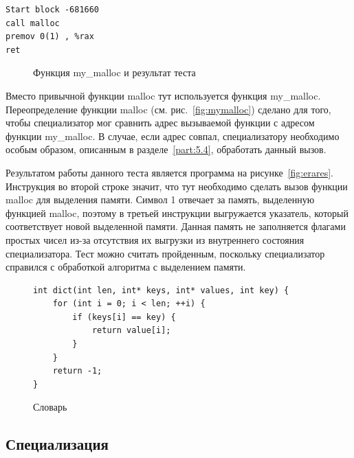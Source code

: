 \newsavebox\boxtw
\begin{lrbox}{\boxtw}
\begin{lstlisting}[xleftmargin = 20pt]
Start block -681660
call malloc
premov 0(1) , %rax 
ret
\end{lstlisting}
\end{lrbox}

\begin{figure}[!t]
\hfill
{}
\caption{Функция my\_malloc и результат теста}
\end{figure}

Вместо привычной функции \textsf{malloc} тут используется функция \textsf{my\_malloc}.
Переопределение функции \textsf{malloc} (см. рис.~\ref{fig:mymalloc}) сделано для того, чтобы специализатор мог сравнить адрес
вызываемой функции с адресом функции \textsf{my\_malloc}.
В случае, если адрес совпал, специализатору необходимо особым образом, описанным в разделе~\ref{part:5.4}, обработать данный вызов.

Результатом работы данного теста является программа на рисунке~\ref{fig:erares}.
Инструкция во второй строке значит, что тут необходимо сделать вызов функции \textsf{malloc} для выделения памяти.
Символ \textsf{1} отвечает за память, выделенную функцией \textsf{malloc}, поэтому в третьей инструкции выгружается указатель,
который соответствует новой выделенной памяти.
Данная память не заполняется флагами простых чисел из-за отсутствия их выгрузки из внутреннего состояния специализатора.
Тест можно считать пройденным, поскольку специализатор справился с обработкой алгоритма с выделением памяти.

\begin{figure}[t]
\begin{lstlisting}[xleftmargin = 20pt]
int dict(int len, int* keys, int* values, int key) {
    for (int i = 0; i < len; ++i) {
        if (keys[i] == key) {
            return value[i];
        }
    }
    return -1;
}
\end{lstlisting}
\caption{ Словарь}
\label{fig:dict}
\end{figure}

\subsection{Специализация}

